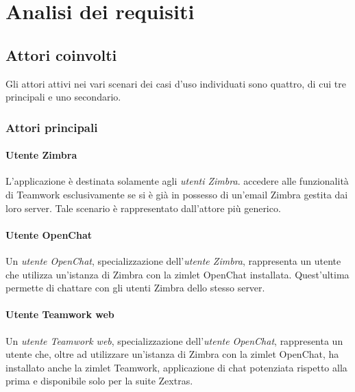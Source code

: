 
\chapter{Analisi dei requisiti}\label{chap:requirements}

\section{Attori coinvolti}
Gli attori attivi nei vari scenari dei casi d'uso individuati sono quattro, di 
cui tre principali e uno secondario.
\subsection{Attori principali}
\subsubsection{Utente Zimbra}
L'applicazione è destinata solamente agli \emph{utenti Zimbra}. 
accedere alle funzionalità di Teamwork esclusivamente se si è già in 
possesso di un'email Zimbra gestita dai loro server. Tale scenario è
rappresentato dall'attore più generico.

\subsubsection{Utente OpenChat}
Un \emph{utente OpenChat}, specializzazione dell'\emph{utente Zimbra},
rappresenta un utente che utilizza un'istanza di Zimbra con la zimlet OpenChat
installata. Quest'ultima permette di chattare con gli utenti Zimbra dello
stesso server.

\subsubsection{Utente Teamwork web}
Un \emph{utente Teamwork web}, specializzazione dell'\emph{utente OpenChat},
rappresenta un utente che, oltre ad utilizzare un'istanza di Zimbra con la
zimlet OpenChat, ha installato anche la zimlet Teamwork, applicazione di chat
potenziata rispetto alla prima e disponibile solo per la suite Zextras.

